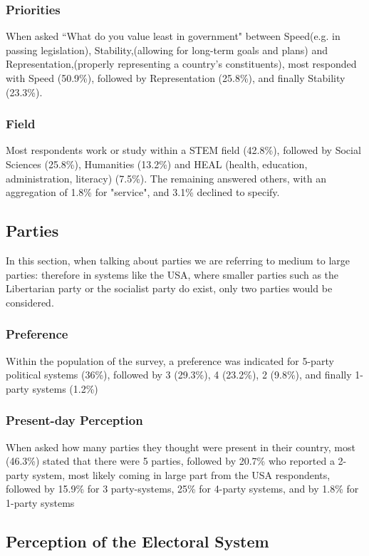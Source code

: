 \documentclass{article}
\begin{document}
\subsubsection{Priorities}
When asked ``What do you value least in government" between Speed(e.g. in passing legislation), Stability,(allowing for long-term goals and plans) and Representation,(properly representing a country's constituents), most responded with Speed (50.9\%), followed by Representation (25.8\%), and finally Stability (23.3\%).

\subsubsection{Field}
Most respondents work or study within a STEM field (42.8\%), followed by Social Sciences (25.8\%), Humanities (13.2\%) and HEAL (health, education, administration, literacy) (7.5\%). The remaining answered others, with an aggregation of 1.8\% for "service", and 3.1\% declined to specify.

\subsection{Parties} %
\label{sub:Parties}
In this section, when talking about parties we are referring to medium to large parties: therefore in systems like the USA, where smaller parties such as the Libertarian party or the socialist party do exist, only two parties would be considered.
\subsubsection{Preference}
Within the population of the survey, a preference was indicated for 5-party political systems (36\%), followed by 3 (29.3\%), 4 (23.2\%), 2 (9.8\%), and finally 1-party systems (1.2\%)

\subsubsection{Present-day Perception}
When asked how many parties they thought were present in their country, most (46.3\%) stated that there were 5 parties, followed by 20.7\% who reported a 2-party system, most likely coming in large part from the USA respondents, followed by 15.9\% for 3 party-systems, 25\% for 4-party systems, and by 1.8\% for 1-party systems

\subsection{Perception of the Electoral System} %
\label{sub:Perception of the Electoral System}
\end{document}
